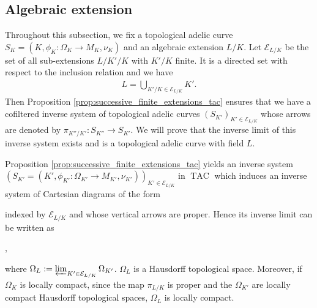 \documentclass [11pt,reqno]{amsart}
\newcommand{\1}{\mathmybb{1}}
\def\cE{{\mathcal{E}}}
\def\TAC{\operatorname{TAC}}
\begin{document}
\subsection{Algebraic extension}
\label{sub:algebraic_extension}

Throughout this subsection, we fix a topological adelic curve $S_{K}=(K,\phi_K : \Omega_K \to M_K,\nu_K)$ and an algebraic extension $L/K$. Let $\cE_{L/K}$ be the set of all sub-extensions $L/K'/K$ with $K'/K$ finite. It is a directed set with respect to the inclusion relation and we have 
\begin{align*}
L = \displaystyle\bigcup_{K'/K \in \cE_{L/K}} K'.
\end{align*}
Then Proposition \ref{prop:successive_finite_extensions_tac} ensures that we have a cofiltered inverse system of topological adelic curves $(S_{K'})_{K'\in \cE_{L/K}}$ whose arrows are denoted by $\pi_{K''/K'} : S_{K''} \to S_{K'}$. We will prove that the inverse limit of this inverse system exists and is a topological adelic curve with field $L$.

Proposition \ref{prop:successive_finite_extensions_tac} yields an inverse system  $(S_{K'}=(K',\phi_{K'}: \Omega_{K'}\to M_{K'},\nu_{K'}))_{K'\in \cE_{L/K}}$ in $\TAC$ which induces an inverse system of Cartesian diagrams of the form
\begin{center}
\end{center}
indexed by $\cE_{L/K}$ and whose vertical arrows are proper. Hence its inverse limit can be written as
\begin{center}
,
\end{center}
where $\Omega_{L} := \varprojlim_{K'\in \cE_{L/K}} \Omega_{K'}$. $\Omega_{L}$ is a Hausdorff topological space. Moreover, if $\Omega_{K}$ is locally compact, since the map $\pi_{L/K}$ is proper and the $\Omega_{K'}$ are locally compact Hausdorff topological spaces, $\Omega_{L}$ is locally compact.
\end{document}

